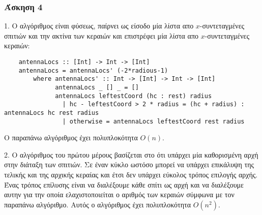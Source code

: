 \newpage

\subsubsection*{Άσκηση 4}

1. Ο αλγόριθμος είναι  φύσεως, παίρνει ως είσοδο μία λίστα απο $x$-συντεταγμένες σπιτιών και την ακτίνα
των κεραιών και επιστρέφει μία λίστα απο $x$-συντεταγμένες κεραιών:

\begin{verbatim}
    antennaLocs :: [Int] -> Int -> [Int]
    antennaLocs = antennaLocs' (-2*radious-1)
        where antennaLocs' :: Int -> [Int] -> Int -> [Int]
              antennaLocs _ [] _ = []
              antennaLocs leftestCoord (hc : rest) radius 
                | hc - leftestCoord > 2 * radius = (hc + radius) : antennaLocs hc rest radius
                | otherwise = antennaLocs leftestCoord rest radius

\end{verbatim}

Ο παραπάνω αλγόριθμος έχει πολυπλοκότητα $O(n)$.

2. Ο αλγόριθμος του πρώτου μέρους βασίζεται στο ότι υπάρχει μία καθορισμένη αρχή στην διάταξη των σπιτιών.
Σε έναν κύκλο ωστόσο μπορεί να υπάρχει επικάλυψη της τελικής και της αρχικής κεραίας και έτσι δεν υπάρχει εύκολος τρόπος
επιλογής αρχής. Ένας τρόπος επίλυσης είναι να διαλέξουμε κάθε σπίτι ως αρχή και να διαλέξουμε αυτην για την οποία ελαχιστοποιείται 
ο αριθμός των κεραιών σύμφωνα με τον παραπάνω αλγόριθμο. Αυτός ο αλγόριθμος έχει πολυπλοκότητα $O(n^2)$.
